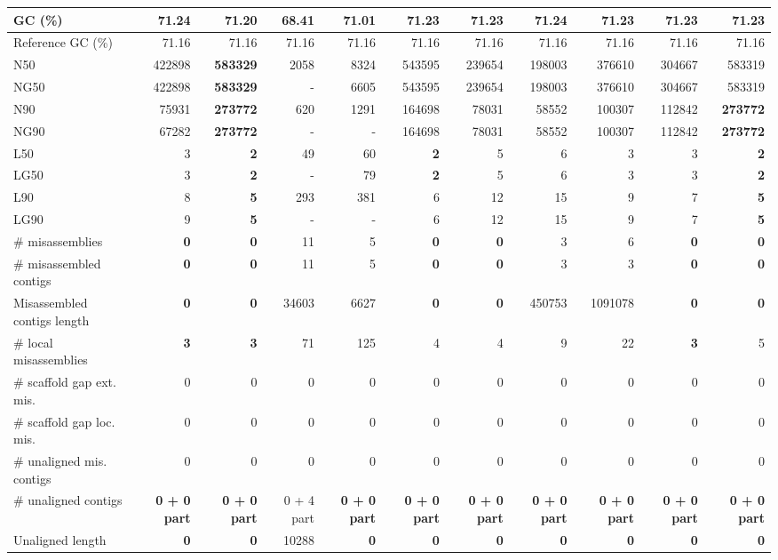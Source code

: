 \documentclass[12pt,a4paper]{article}
\begin{document}
\begin{table}[ht]
\begin{center}
\begin{tabular}{|l*{10}{|r}|}
GC (\%) & 71.24 & 71.20 & 68.41 & 71.01 & 71.23 & 71.23 & 71.24 & 71.23 & 71.23 & 71.23 \\ \hline
Reference GC (\%) & 71.16 & 71.16 & 71.16 & 71.16 & 71.16 & 71.16 & 71.16 & 71.16 & 71.16 & 71.16 \\ \hline
N50 & 422898 & {\bf 583329} & 2058 & 8324 & 543595 & 239654 & 198003 & 376610 & 304667 & 583319 \\ \hline
NG50 & 422898 & {\bf 583329} & - & 6605 & 543595 & 239654 & 198003 & 376610 & 304667 & 583319 \\ \hline
N90 & 75931 & {\bf 273772} & 620 & 1291 & 164698 & 78031 & 58552 & 100307 & 112842 & {\bf 273772} \\ \hline
NG90 & 67282 & {\bf 273772} & - & - & 164698 & 78031 & 58552 & 100307 & 112842 & {\bf 273772} \\ \hline
L50 & 3 & {\bf 2} & 49 & 60 & {\bf 2} & 5 & 6 & 3 & 3 & {\bf 2} \\ \hline
LG50 & 3 & {\bf 2} & - & 79 & {\bf 2} & 5 & 6 & 3 & 3 & {\bf 2} \\ \hline
L90 & 8 & {\bf 5} & 293 & 381 & 6 & 12 & 15 & 9 & 7 & {\bf 5} \\ \hline
LG90 & 9 & {\bf 5} & - & - & 6 & 12 & 15 & 9 & 7 & {\bf 5} \\ \hline
\# misassemblies & {\bf 0} & {\bf 0} & 11 & 5 & {\bf 0} & {\bf 0} & 3 & 6 & {\bf 0} & {\bf 0} \\ \hline
\# misassembled contigs & {\bf 0} & {\bf 0} & 11 & 5 & {\bf 0} & {\bf 0} & 3 & 3 & {\bf 0} & {\bf 0} \\ \hline
Misassembled contigs length & {\bf 0} & {\bf 0} & 34603 & 6627 & {\bf 0} & {\bf 0} & 450753 & 1091078 & {\bf 0} & {\bf 0} \\ \hline
\# local misassemblies & {\bf 3} & {\bf 3} & 71 & 125 & 4 & 4 & 9 & 22 & {\bf 3} & 5 \\ \hline
\# scaffold gap ext. mis. & 0 & 0 & 0 & 0 & 0 & 0 & 0 & 0 & 0 & 0 \\ \hline
\# scaffold gap loc. mis. & 0 & 0 & 0 & 0 & 0 & 0 & 0 & 0 & 0 & 0 \\ \hline
\# unaligned mis. contigs & 0 & 0 & 0 & 0 & 0 & 0 & 0 & 0 & 0 & 0 \\ \hline
\# unaligned contigs & {\bf 0 + 0 part} & {\bf 0 + 0 part} & 0 + 4 part & {\bf 0 + 0 part} & {\bf 0 + 0 part} & {\bf 0 + 0 part} & {\bf 0 + 0 part} & {\bf 0 + 0 part} & {\bf 0 + 0 part} & {\bf 0 + 0 part} \\ \hline
Unaligned length & {\bf 0} & {\bf 0} & 10288 & {\bf 0} & {\bf 0} & {\bf 0} & {\bf 0} & {\bf 0} & {\bf 0} & {\bf 0} \\ \hline

\end{tabular}
\end{center}
\end{table}
\end{document}
